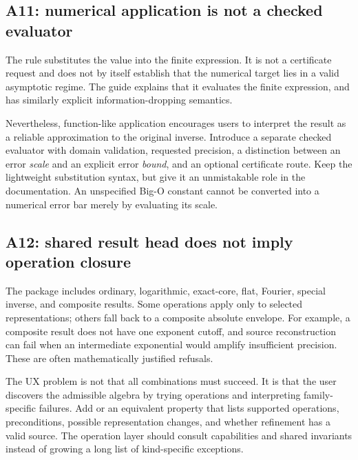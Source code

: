 \subsection{A11: numerical application is not a checked evaluator}
The rule  substitutes the value into the finite expression. It is not a certificate request and does not by itself establish that the numerical target lies in a valid asymptotic regime. The guide explains that it evaluates the finite expression, and  has similarly explicit information-dropping semantics.\cite{core,guide}

Nevertheless, function-like application encourages users to interpret the result as a reliable approximation to the original inverse. Introduce a separate checked evaluator with domain validation, requested precision, a distinction between an error \emph{scale} and an explicit error \emph{bound}, and an optional certificate route. Keep the lightweight substitution syntax, but give it an unmistakable role in the documentation. An unspecified Big-O constant cannot be converted into a numerical error bar merely by evaluating its scale.

\subsection{A12: shared result head does not imply operation closure}
The package includes ordinary, logarithmic, exact-core, flat, Fourier, special inverse, and composite results. Some operations apply only to selected representations; others fall back to a composite absolute envelope. For example, a composite result does not have one exponent cutoff, and source reconstruction can fail when an intermediate exponential would amplify insufficient precision. These are often mathematically justified refusals.\cite{arithmetic,sourcecharts,guide}

The UX problem is not that all combinations must succeed. It is that the user discovers the admissible algebra by trying operations and interpreting family-specific failures. Add  or an equivalent property that lists supported operations, preconditions, possible representation changes, and whether refinement has a valid source. The operation layer should consult capabilities and shared invariants instead of growing a long list of kind-specific exceptions.

